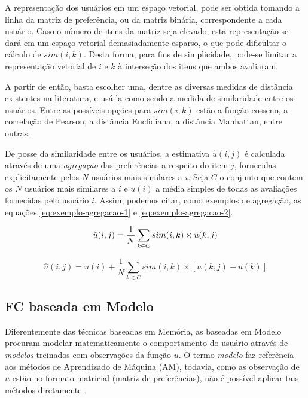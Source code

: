 A representação dos usuários em um espaço vetorial, pode ser obtida tomando a linha da matriz de preferência, ou da matriz binária, correspondente a cada usuário. Caso o número de itens da matriz seja elevado, esta representação se dará em um espaço vetorial demasiadamente esparso, o que pode dificultar o cálculo de $sim(i,k)$. Desta forma, para fins de simplicidade, pode-se limitar a representação vetorial de $i$ e $k$ à interseção dos itens que ambos avaliaram. 

A partir de então, basta escolher uma, dentre as diversas medidas de distância existentes na literatura, e usá-la como sendo a medida de similaridade entre os usuários. Entre as possíveis opções para $sim(i,k)$ estão a função cosseno, a correlação de Pearson, a distância Euclidiana, a distância Manhattan, entre outras.

De posse da similaridade entre os usuários, a estimativa $\hat{u}(i,j)$ é calculada através de uma \textit{agregação} das preferências a respeito do item $j$, fornecidas explicitamente pelos $N$ usuários mais similares a $i$. Seja $C$ o conjunto que contem os $N$ usuários mais similares a $i$ e $\overline{u}(i)$ a média simples de todas as avaliações fornecidas pelo usuário $i$. Assim, podemos citar, como exemplos de agregação, as equações \ref{eq:exemplo-agregacao-1} e \ref{eq:exemplo-agregacao-2}.   

\begin{equation}
\hat{u}(i,j) = \frac{1}{N} \sum_{k \in C} sim(i,k) \times u(k,j) \\ 
\label{eq:exemplo-agregacao-1}
\end{equation}

\begin{equation}
\hat{u}(i,j) = \overline{u}(i) + \frac{1}{N} \sum_{k \in C} sim(i,k) \times [u(k,j) - \overline{u}(k)]
\label{eq:exemplo-agregacao-2}
\end{equation}

\subsection{FC baseada em Modelo}
Diferentemente das técnicas baseadas em Memória, as baseadas em Modelo procuram modelar matematicamente o comportamento do usuário através de \textit{modelos} treinados com observações da função $u$. O termo \textit{modelo} faz referência aos métodos de Aprendizado de Máquina (AM), todavia, como as observação de $u$ estão no formato matricial (matriz de preferências), não é possível aplicar tais métodos diretamente \citep{braida:2013}.

